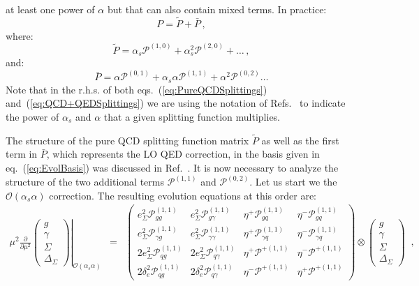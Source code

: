 at least one power of $\alpha$ but that can also contain mixed
terms. In practice:
\begin{equation}
P = \widetilde{P} + \bar{P}\,,
\end{equation}
where:
\begin{equation}\label{eq:PureQCDSplittings}
\widetilde{P} = \alpha_s \mathcal{P}^{(1,0)} + \alpha_s^2 \mathcal{P}^{(2,0)}+\dots\,,
\end{equation}
and:
\begin{equation}\label{eq:QCD+QEDSplittings}
\bar{P} = \alpha \mathcal{P}^{(0,1)} + \alpha_s\alpha \mathcal{P}^{(1,1)}+\alpha^2 \mathcal{P}^{(0,2)}\dots
\end{equation}
Note that in the r.h.s. of both eqs.~(\ref{eq:PureQCDSplittings})
and~(\ref{eq:QCD+QEDSplittings}) we are using the notation of
Refs.~\cite{deFlorian:2015ujt,deFlorian:2016gvk} to indicate the power
of $\alpha_s$ and $\alpha$ that a given splitting function multiplies.

The structure of the pure QCD splitting function matrix
$\widetilde{P}$ as well as the first term in $\bar{P}$, which
represents the LO QED correction, in the basis given in
eq.~(\ref{eq:EvolBasis}) was discussed in
Ref.~\cite{Bertone:2015lqa}. It is now necessary to analyze the
structure of the two additional terms $\mathcal{P}^{(1,1)}$ and
$\mathcal{P}^{(0,2)}$. Let us start we the
$\mathcal{O}(\alpha_s\alpha)$ correction. The resulting evolution
equations at this order are:
\begin{equation}
\begin{array}{rcl}
\displaystyle\left.\mu^2\frac{\partial}{\partial \mu^2}
\begin{pmatrix}
g\\
\gamma\\
\Sigma\\
\Delta_\Sigma
\end{pmatrix}
\right|_{\mathcal{O}(\alpha_s \alpha)} &=& \displaystyle \begin{pmatrix}
e_\Sigma^2 \mathcal{P}^{(1,1)}_{gg}      & e_\Sigma^2 \mathcal{P}^{(1,1)}_{g\gamma} & \eta^+\mathcal{P}^{(1,1)}_{gq} & \eta^-\mathcal{P}^{(1,1)}_{gq} \\
e_\Sigma^2 \mathcal{P}^{(1,1)}_{\gamma g} & e_\Sigma^2 \mathcal{P}^{(1,1)}_{\gamma\gamma} & \eta^+\mathcal{P}^{(1,1)}_{\gamma q} &\eta^-\mathcal{P}^{(1,1)}_{\gamma q} \\
2 e_\Sigma^2 \mathcal{P}^{(1,1)}_{qg}    & 2 e_\Sigma^2 \mathcal{P}^{(1,1)}_{q\gamma} & \eta^+\mathcal{P}^{+(1,1)}  & \eta^-\mathcal{P}^{+(1,1)}\\
2 \delta_e^2 \mathcal{P}^{(1,1)}_{qg} & 2 \delta_e^2 \mathcal{P}^{(1,1)}_{q\gamma} &\eta^-\mathcal{P}^{+(1,1)} &\eta^+\mathcal{P}^{+(1,1)}
\end{pmatrix}\otimes
\begin{pmatrix}
g\\
\gamma\\
\Sigma\\
\Delta_\Sigma
\end{pmatrix}
\end{array}\,,
\end{equation}

